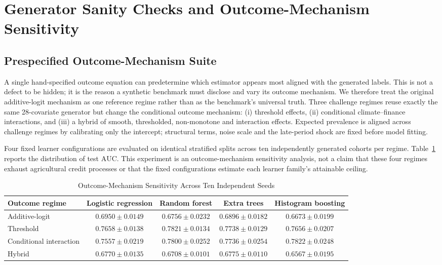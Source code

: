 \documentclass[journal]{IEEEtran}
\newcommand{\auc}{\mbox{AUC}}
\begin{document}
\section{Generator Sanity Checks and Outcome-Mechanism Sensitivity}
\label{sec:benchmark}

\subsection{Prespecified Outcome-Mechanism Suite}
\label{sec:regimes}

A single hand-specified outcome equation can predetermine which estimator appears most aligned with the generated labels. This is not a defect to be hidden; it is the reason a synthetic benchmark must disclose and vary its outcome mechanism. We therefore treat the original additive-logit mechanism as one reference regime rather than as the benchmark's universal truth. Three challenge regimes reuse exactly the same 28-covariate generator but change the conditional outcome mechanism: (i) threshold effects, (ii) conditional climate--finance interactions, and (iii) a hybrid of smooth, thresholded, non-monotone and interaction effects. Expected prevalence is aligned across challenge regimes by calibrating only the intercept; structural terms, noise scale and the late-period shock are fixed before model fitting.

Four fixed learner configurations are evaluated on identical stratified splits across ten independently generated cohorts per regime. Table~\ref{tab:regimes} reports the distribution of test $\auc$. This experiment is an outcome-mechanism sensitivity analysis, not a claim that these four regimes exhaust agricultural credit processes or that the fixed configurations estimate each learner family's attainable ceiling.

\begin{table}[!t]
\caption{Outcome-Mechanism Sensitivity Across Ten Independent Seeds}
\label{tab:regimes}
\centering
\footnotesize
\begin{tabular}{@{}lcccc@{}}
\toprule
Outcome regime & Logistic regression & Random forest & Extra trees & Histogram boosting \\
\midrule
Additive-logit & \textbf{$0.6950\pm0.0149$} & $0.6756\pm0.0232$ & $0.6896\pm0.0182$ & $0.6673\pm0.0199$ \\
Threshold & $0.7658\pm0.0138$ & \textbf{$0.7821\pm0.0134$} & $0.7738\pm0.0129$ & $0.7656\pm0.0207$ \\
Conditional interaction & $0.7557\pm0.0219$ & $0.7800\pm0.0252$ & $0.7736\pm0.0254$ & \textbf{$0.7822\pm0.0248$} \\
Hybrid & $0.6770\pm0.0135$ & $0.6708\pm0.0101$ & \textbf{$0.6775\pm0.0110$} & $0.6567\pm0.0195$ \\
\bottomrule
\end{tabular}
\end{table}
\end{document}
